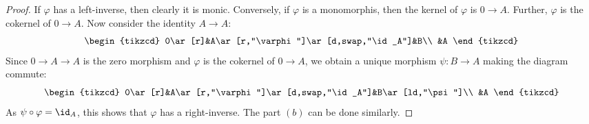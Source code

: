 \begin{proof}
If $\varphi$ has a left-inverse, then clearly it is monic. Conversely, if $\varphi$ is a monomorphis, then the kernel of $\varphi$ is $0\to A$. Further, $\varphi$ is the cokernel of $0\to A$. Now consider the identity $A\to A$:
\[\begin{tikzcd}
0\ar[r]&A\ar[r,"\varphi"]\ar[d,swap,"\id_A"]&B\\
&A
\end{tikzcd}\]
Since $0\to A\to A$ is the zero morphism and $\varphi$ is the cokernel of $0\to A$, we obtain a unique morphism $\psi:B\to A$ making the diagram commute:
\[\begin{tikzcd}
0\ar[r]&A\ar[r,"\varphi"]\ar[d,swap,"\id_A"]&B\ar[ld,"\psi"]\\
&A
\end{tikzcd}\]
As $\psi\circ\varphi=\id_A$, this shows that $\varphi$ has a right-inverse. The part $(b)$ can be done similarly.
\end{proof}
